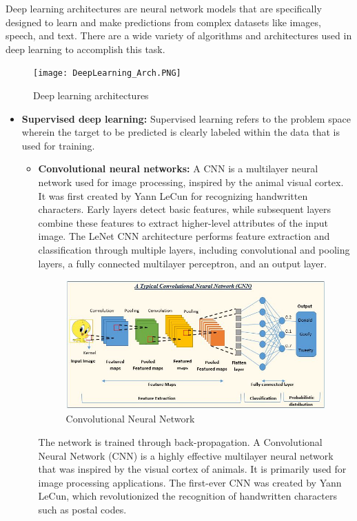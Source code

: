 \begin{itemize}
Deep learning architectures are neural network models that are specifically designed to learn and make predictions from complex datasets like images, speech, and text. There are a wide variety of algorithms and architectures used in deep learning to accomplish this task.
\begin{figure}[H]
    \centering\texttt{[image: DeepLearning\_Arch.PNG]}
    \caption{Deep learning architectures \cite{madhavan2017deep}}
\end{figure}
\begin{itemize}
    \item \textbf{Supervised deep learning: }
    Supervised learning refers to the problem space wherein the target to be predicted is clearly labeled within the data that is used for training.
    \begin{itemize}
        \item \textbf{Convolutional neural networks: } A CNN is a multilayer neural network used for image processing, inspired by the animal visual cortex. It was first created by Yann LeCun for recognizing handwritten characters. Early layers detect basic features, while subsequent layers combine these features to extract higher-level attributes of the input image. The LeNet CNN architecture performs feature extraction and classification through multiple layers, including convolutional and pooling layers, a fully connected multilayer perceptron, and an output layer. 
        \begin{figure}[H]
            \centering
            \includegraphics[width=0.8\linewidth]{tex/img/CNN.jpeg}
            \caption{Convolutional Neural Network \cite{Saily_Shah}}
            \label{fig:CNN}
        \end{figure}
        The network is trained through back-propagation. A Convolutional Neural Network (CNN) is a highly effective multilayer neural network that was inspired by the visual cortex of animals. It is primarily used for image processing applications. The first-ever CNN was created by Yann LeCun, which revolutionized the recognition of handwritten characters such as postal codes.
        

\end{itemize}
\end{itemize}
\end{itemize}
